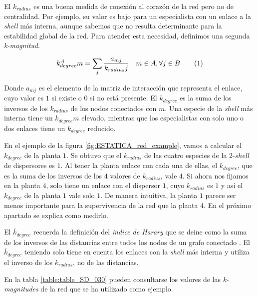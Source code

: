 El ${k}_{radius}$ es una buena medida de conexión al corazón de la red pero no de centralidad. Por ejemplo, su valor es bajo para un especialista con un enlace a la \textit{shell} más interna, aunque sabemos que no resulta determinante para la estabilidad global de la red. Para atender esta necesidad, definimos una segunda \textit{k-magnitud}.

\begin{theo} 
\begin{align*}
\displaystyle
k^A_{degree}m = \sum\limits_{j} \frac{a_{mj} }{k_{radius}j}  \quad   m \in A, \forall j \in B
\stepcounter{equation}\tag{\theequation}
\end{align*}
\label{kdegree}
\end{theo}

Donde $a_{mj}$ es el elemento de la matriz de interacción que representa el enlace, cuyo valor es $1$ si existe o $0$ si no está presente. El $k_{degree}$ es la suma de los inversos de los $k_{radius}$ de los nodos conectados con $m$. Una especie de la \textit{shell} más interna tiene un $k_{degree}m$ elevado,  mientras que los especialistas con solo uno o dos enlaces tiene un $k_{degree}$ reducido. 

En el ejemplo de la figura \ref{fig:ESTATICA_red_example}, vamos a calcular el $k_{degree}$ de la planta $1$. Se obtuvo que el $k_{radius}$ de las cuatro especies de la $2$-$shell$ de dispersores es $1$. Al tener la planta enlace con cada una de ellas, el $k_{degree}$, que es la suma de los inversos de los $4$ valores de $k_{radius}$, vale $4$. Si ahora nos fijamos en la planta $4$, solo tiene un enlace con el dispersor $1$, cuyo $k_{radius}$ es $1$ y así el $k_{degree}$ de la planta $1$ vale solo $1$. De manera intuitiva, la planta $1$ parece ser menos importante para la supervivencia de la red que la planta $4$. En el próximo apartado se explica como medirlo.

El  $\overline k_{degree}$ recuerda la definición del \textit{índice de Harary} que se deine como la suma de los inversos de las distancias entre todos los nodos de un grafo conectado \cite{plavvsic1993harary}. El  $\overline k_{degree}$ teniendo solo tiene en cuenta los enlaces con la \textit{shell} más interna y utiliza el inverso de los $k_{radius}$, no de las distancias.

En la tabla \ref{table:table_SD_030} pueden consultarse los valores de las \textit{k-magnitudes} de la red que se ha utilizado como ejemplo.

